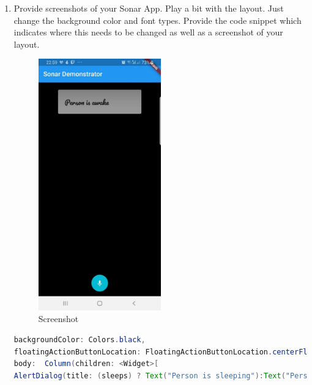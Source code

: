 \documentclass{homework}
\begin{document}
\begin{enumerate}
Since we have bool variable sleep or not sleep, we can send sleep data type with a value of 2 if a person is sleeping and 1 otherwise. Using our pipeline, we can only determine whether it is sleep or not. Indeed, this is a more appropriate usecase for the Sonar app.
\item Provide screenshots of your Sonar App. Play a bit with the layout. Just change the background color and font types. Provide the code snippet which indicates where this needs to be changed as well as a screenshot of your layout.

\begin{figure}[hbt!]
	\centering
	\includegraphics[width=0.5\textwidth]{screenshotjpg.jpg}
	\caption{Screenshot}
\end{figure}
	\begin{lstlisting}[language=Java, caption=Color and background settings in .dart file]
backgroundColor: Colors.black,
floatingActionButtonLocation: FloatingActionButtonLocation.centerFloat,
body:  Column(children: <Widget>[
AlertDialog(title: (sleeps) ? Text("Person is sleeping"):Text("Person is awake", style: GoogleFonts.pacifico()),backgroundColor:Colors.white60),
	\end{lstlisting}
\end{enumerate}
\end{document}
